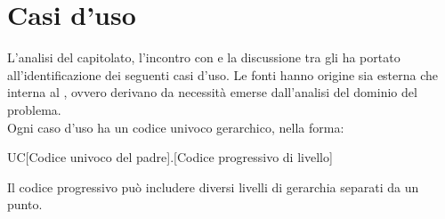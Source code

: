 \section{Casi d'uso}
L'analisi del capitolato, l'incontro con \proponente e la discussione tra gli \rAs ha portato all'identificazione dei seguenti casi d'uso.
Le fonti hanno origine sia esterna che interna al , ovvero derivano da necessità emerse dall'analisi del dominio del problema.\\
Ogni caso d'uso ha un codice univoco gerarchico, nella forma:
\begin{center}
UC[Codice univoco del padre].[Codice progressivo di livello]
\end{center}
Il codice progressivo può includere diversi livelli di gerarchia separati da un punto.

